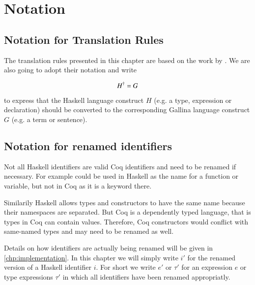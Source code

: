\section{Notation} \label{sec:translation:notation}

\subsection{Notation for Translation Rules}

The translation rules presented in this chapter are based on the work by \cite{Abel:2005}.
We are also going to adopt their notation and write

\[
  {H}^{\dagger} = G
\]

to express that the Haskell language construct $H$ (e.g. a type, expression or declaration) should be converted to the corresponding Gallina language construct $G$ (e.g. a term or sentence).

\subsection{Notation for renamed identifiers}

Not all Haskell identifiers are valid Coq identifiers and need to be renamed if necessary.
For example  could be used in Haskell as the name for a function or variable, but not in Coq as it is a keyword there.

Similarily Haskell allows types and constructors to have the same name because their namespaces are separated.
But Coq is a dependently typed language, that is types in Coq can contain values.
Therefore, Coq constructors would conflict with same-named types and may need to be renamed as well.

Details on how identifiers are actually being renamed will be given in \autoref{chp:implementation}.
In this chapter we will simply write $i'$ for the renamed version of a Haskell identifier $i$.
For short we write $e'$ or $\tau'$ for an expression $e$ or type expressions $\tau'$ in which all identifiers have been renamed appropriatly.
